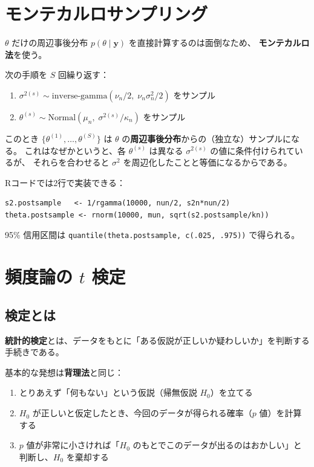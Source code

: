 \documentclass[12pt,a4paper]{ltjsarticle}
\begin{document}
\section{モンテカルロサンプリング}

$\theta$ だけの周辺事後分布 $p(\theta \mid \mathbf{y})$ を直接計算するのは面倒なため、
\textbf{モンテカルロ法}を使う。

次の手順を $S$ 回繰り返す：

\begin{enumerate}
  \item $\sigma^{2(s)} \sim \mathrm{inverse\text{-}gamma}(\nu_n/2,\; \nu_n\sigma_n^2/2)$ をサンプル
  \item $\theta^{(s)} \sim \mathrm{Normal}(\mu_n,\; \sigma^{2(s)}/\kappa_n)$ をサンプル
\end{enumerate}

このとき $\{\theta^{(1)}, \ldots, \theta^{(S)}\}$ は $\theta$ の\textbf{周辺事後分布}からの（独立な）サンプルになる。
これはなぜかというと、各 $\theta^{(s)}$ は異なる $\sigma^{2(s)}$ の値に条件付けられているが、
それらを合わせると $\sigma^2$ を周辺化したことと等価になるからである。

Rコードでは2行で実装できる：

\begin{lstlisting}
s2.postsample   <- 1/rgamma(10000, nun/2, s2n*nun/2)
theta.postsample <- rnorm(10000, mun, sqrt(s2.postsample/kn))
\end{lstlisting}

95\% 信用区間は \lstinline{quantile(theta.postsample, c(.025, .975))} で得られる。

\section{頻度論の $t$ 検定}

\subsection{検定とは}

\textbf{統計的検定}とは、データをもとに「ある仮説が正しいか疑わしいか」を判断する手続きである。

基本的な発想は\textbf{背理法}と同じ：

\begin{enumerate}
  \item とりあえず「何もない」という仮説（帰無仮説 $H_0$）を立てる
  \item $H_0$ が正しいと仮定したとき、今回のデータが得られる確率（$p$ 値）を計算する
  \item $p$ 値が非常に小さければ「$H_0$ のもとでこのデータが出るのはおかしい」と判断し、$H_0$ を棄却する
\end{enumerate}
\end{document}
